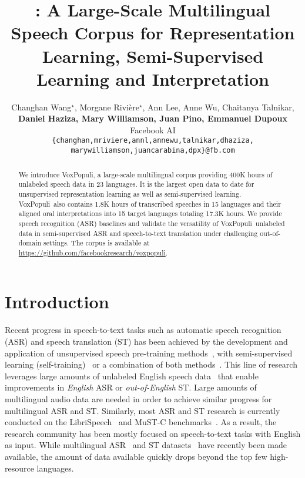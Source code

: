 \documentclass[11pt,a4paper]{article}
\title{\vp: A Large-Scale Multilingual Speech Corpus for Representation Learning, Semi-Supervised Learning and Interpretation}
\author{Changhan Wang$^{\star}$, Morgane Rivi\`ere$^{\star}$, Ann Lee, Anne Wu, Chaitanya Talnikar, \\
\textbf{Daniel Haziza, Mary Williamson, Juan Pino, Emmanuel Dupoux} \vspace*{0.2cm} \\
  Facebook AI \vspace*{0.2cm} \\
  \texttt{\{changhan,mriviere,annl,annewu,talnikar,dhaziza,} \\
  \texttt{marywilliamson,juancarabina,dpx\}@fb.com}}
\date{}
\newcommand{\vp}{VoxPopuli}
\begin{document}
\maketitle

\renewcommand{\thefootnote}{$^{\star}$}
\renewcommand{\thefootnote}{1}

\begin{abstract}
We introduce \vp, a large-scale multilingual corpus providing 400K hours of unlabeled speech data in 23 languages. It is the largest open data to date for unsupervised representation learning as well as semi-supervised learning. \vp~also contains 1.8K hours of transcribed speeches in 15 languages and their aligned oral interpretations into 15 target languages totaling 17.3K hours. We provide speech recognition (ASR) baselines and validate the versatility of \vp~unlabeled data in semi-supervised ASR and speech-to-text translation under challenging out-of-domain settings. The corpus is available
at \url{https://github.com/facebookresearch/voxpopuli}.
\end{abstract}

\section{Introduction}

Recent progress in speech-to-text tasks such as automatic speech recognition (ASR) and speech translation (ST) has been achieved by the development and application of unsupervised speech pre-training methods~\cite{oord2018representation,Schneider2019,baevski2020wav2vec,conneau2020unsupervised,Wu2020SelfSupervisedRI,Nguyen2020InvestigatingSP}, with semi-supervised learning (self-training)~\cite{kahn2020self,Pino2020SelfTrainingFE,zhang2020pushing,xu2020self} or a combination of both methods~\cite{xu2020self}.
This line of research leverages large amounts of unlabeled English speech data~\cite{kahn2020libri} that enable improvements in \emph{English} ASR or \emph{out-of-English} ST.
Large amounts of multilingual audio data are needed in order to achieve similar progress for multilingual ASR and ST.
Similarly, most ASR and ST research is currently conducted on the LibriSpeech~\cite{panayotov2015librispeech} and MuST-C benchmarks~\cite{cattoni2020must,di2019must}. As a result, the research community has been mostly focused on speech-to-text tasks with English as input.
While multilingual ASR~\cite{Pratap2020,ardila-etal-2020-common} and ST datasets~\cite{wang2020covost,iranzo2020europarl} have recently been made available, the amount of data available quickly drops beyond the top few high-resource languages.
\end{document}
